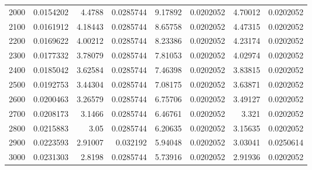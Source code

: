\begin{tabular}{rrrrrrrr}
          2000 &               0.0154202  &    4.4788  &        0.0285744 &    9.17892 &         0.0202052 &    4.70012 &        0.0202052 \\
          2100 &               0.0161912  &    4.18443 &        0.0285744 &    8.65758 &         0.0202052 &    4.47315 &        0.0202052 \\
          2200 &               0.0169622  &    4.00212 &        0.0285744 &    8.23386 &         0.0202052 &    4.23174 &        0.0202052 \\
          2300 &               0.0177332  &    3.78079 &        0.0285744 &    7.81053 &         0.0202052 &    4.02974 &        0.0202052 \\
          2400 &               0.0185042  &    3.62584 &        0.0285744 &    7.46398 &         0.0202052 &    3.83815 &        0.0202052 \\
          2500 &               0.0192753  &    3.44304 &        0.0285744 &    7.08175 &         0.0202052 &    3.63871 &        0.0202052 \\
          2600 &               0.0200463  &    3.26579 &        0.0285744 &    6.75706 &         0.0202052 &    3.49127 &        0.0202052 \\
          2700 &               0.0208173  &    3.1466  &        0.0285744 &    6.46761 &         0.0202052 &    3.321   &        0.0202052 \\
          2800 &               0.0215883  &    3.05    &        0.0285744 &    6.20635 &         0.0202052 &    3.15635 &        0.0202052 \\
          2900 &               0.0223593  &    2.91007 &        0.032192  &    5.94048 &         0.0202052 &    3.03041 &        0.0250614 \\
          3000 &               0.0231303  &    2.8198  &        0.0285744 &    5.73916 &         0.0202052 &    2.91936 &        0.0202052 \\
\hline
\end{tabular}